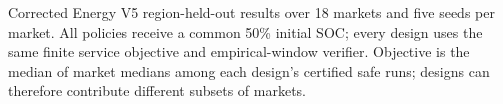 \begin{table}[p]
\centering
\small
\caption{Corrected Energy V5 region-held-out results over 18 markets and five seeds
per market.  All policies receive a common 50\% initial SOC; every design
uses the same finite service objective and empirical-window verifier.
Objective is the median of market medians among each design's certified safe
runs; designs can therefore contribute different subsets of markets.}
\label{tab:energy-results}
\resizebox{0.94\textwidth}{!}{}
\end{table}
